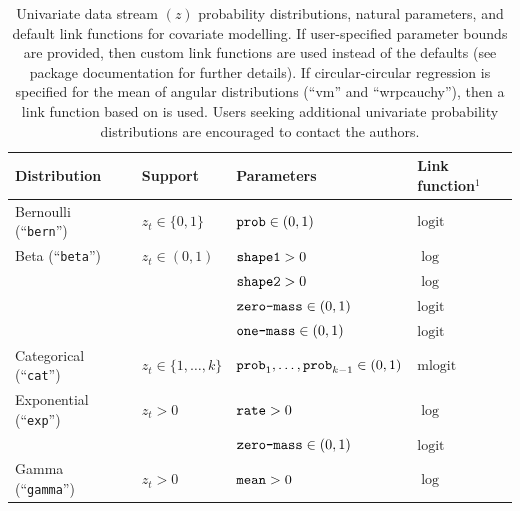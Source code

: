 \documentclass[12pt]{article}\usepackage[]{graphicx}\usepackage[]{xcolor}
\begin{document}
\begin{small}
\begin{table}
  \caption{\label{tab:unipdfs} Univariate data stream $(z)$ probability distributions, natural parameters, and default link functions for covariate modelling. If user-specified parameter bounds are provided, then custom link functions are used instead of the defaults (see package documentation for further details). %
If circular-circular regression is specified for the mean of angular distributions (``vm'' and ``wrpcauchy''), then a link function based on \cite{RivestEtAl2016} is used. Users seeking additional univariate probability distributions are encouraged to contact the authors.}
  \begin{tabular}{llll}
  \toprule
  Distribution                                & Support                       & Parameters                                      & Link function$^1$ \tabularnewline
  \midrule
  \rowcolor{Gray} Bernoulli (``\verb|bern|'') & $z_t\in\{0,1\}$               & $\verb|prob|\in(0,1)$                           &  $\text{logit}$ \tabularnewline  
  Beta (``\verb|beta|'')                      & $z_t\in(0,1)$                 & $\verb|shape1|>0$                               &  $\log$ \tabularnewline  
                                              &                               & $\verb|shape2|>0$                               &  $\log$ \tabularnewline
                                              &                               & $\verb|zero-mass|\in(0,1)$                      &  $\text{logit}$ \tabularnewline 
                                              &                               & $\verb|one-mass|\in(0,1)$                       &  $\text{logit}$ \tabularnewline 
  \rowcolor{Gray} Categorical (``\verb|cat|'')& $z_t\in\{1,\ldots,k\}$        & $\verb|prob|_1,\ldots,\verb|prob|_{k-1}\in(0,1)$&  $\text{mlogit}$ \tabularnewline    
  Exponential (``\verb|exp|'')                & $z_t>0$                       & $\verb|rate|>0$                                 &  $\log$ \tabularnewline  
                                              &                               & $\verb|zero-mass|\in(0,1)$                      &  $\text{logit}$ \tabularnewline 
  \rowcolor{Gray} Gamma (``\verb|gamma|'')    & $z_t>0$                       & $\verb|mean|>0$                                 &  $\log$ \tabularnewline  

\end{tabular}
\end{table}
\end{small}
\end{document}

